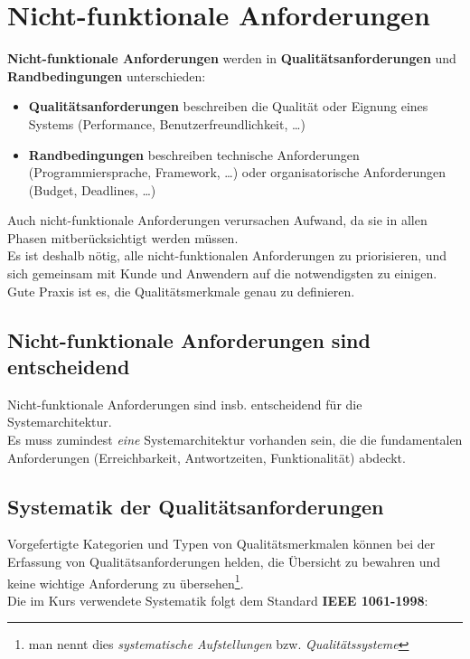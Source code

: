 \section{Nicht-funktionale Anforderungen}

\noindent
\textbf{Nicht-funktionale Anforderungen} werden in \textbf{Qualitätsanforderungen} und \textbf{Randbedingungen} unterschieden:

\begin{itemize}
    \item \textbf{Qualitätsanforderungen} beschreiben die Qualität oder Eignung eines Systems (Performance, Benutzerfreundlichkeit, \ldots)
    \item \textbf{Randbedingungen} beschreiben technische Anforderungen (Programmiersprache, Framework, \ldots) oder organisatorische Anforderungen (Budget, Deadlines, \ldots)
\end{itemize}

\noindent
Auch nicht-funktionale Anforderungen verursachen Aufwand, da sie in allen Phasen mitberücksichtigt werden müssen.\\
Es ist deshalb nötig, alle nicht-funktionalen Anforderungen zu priorisieren, und sich gemeinsam mit Kunde und Anwendern auf die notwendigsten zu einigen.\\
Gute Praxis ist es, die Qualitätsmerkmale genau zu definieren.

\subsection*{Nicht-funktionale Anforderungen sind entscheidend}
Nicht-funktionale Anforderungen sind insb. entscheidend für die Systemarchitektur.\\
Es muss zumindest \textit{eine} Systemarchitektur vorhanden sein, die die fundamentalen Anforderungen (Erreichbarkeit, Antwortzeiten, Funktionalität) abdeckt.

\subsection*{Systematik der Qualitätsanforderungen}
Vorgefertigte Kategorien und Typen von Qualitätsmerkmalen können bei der Erfassung von Qualitätsanforderungen helden, die Übersicht zu bewahren und keine wichtige Anforderung zu übersehen\footnote{man nennt dies \textit{systematische Aufstellungen} bzw. \textit{Qualitätssysteme}}.\\

\noindent
Die im Kurs verwendete Systematik folgt dem Standard \textbf{IEEE 1061-1998}:

